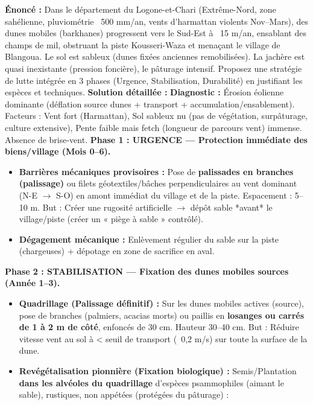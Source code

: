 \documentclass[11pt]{article}
\begin{document}
\begin{exoresolu}
    \textbf{Énoncé :} Dans le département du Logone-et-Chari (Extrême-Nord, zone sahélienne, pluviométrie ~500 mm/an, vents d'harmattan violents Nov–Mars), des dunes mobiles (barkhanes) progressent vers le Sud-Est à ~15 m/an, ensablant des champs de mil, obstruant la piste Kousseri-Waza et menaçant le village de Blangoua. Le sol est sableux (dunes fixées anciennes remobilisées). La jachère est quasi inexistante (pression foncière), le pâturage intensif. Proposez une stratégie de lutte intégrée en 3 phases (Urgence, Stabilisation, Durabilité) en justifiant les espèces et techniques.
    \tcblower
    \textbf{Solution détaillée :}
    \textbf{Diagnostic :} Érosion éolienne dominante (déflation source dunes + transport + accumulation/ensablement). Facteurs : Vent fort (Harmattan), Sol sableux nu (pas de végétation, surpâturage, culture extensive), Pente faible mais fetch (longueur de parcours vent) immense. Absence de brise-vent.
    \vspace{0,2cm}
    \textbf{Phase 1 : URGENCE — Protection immédiate des biens/village (Mois 0–6).}
    \begin{itemize}
        \item \textbf{Barrières mécaniques provisoires :} Pose de \textbf{palissades en branches (palissage)} ou filets géotextiles/bâches perpendiculaires au vent dominant (N-E $\rightarrow$ S-O) en amont immédiat du village et de la piste. Espacement : 5–10 m. But : Créer une rugosité artificielle $\rightarrow$ dépôt sable *avant* le village/piste (créer un « piège à sable » contrôlé).
        \item \textbf{Dégagement mécanique :} Enlèvement régulier du sable sur la piste (chargeuses) + dépotage en zone de sacrifice en aval.
    \end{itemize}
    \textbf{Phase 2 : STABILISATION — Fixation des dunes mobiles sources (Année 1–3).}
    \begin{itemize}
        \item \textbf{Quadrillage (Palissage définitif) :} Sur les dunes mobiles actives (source), pose de branches (palmiers, acacias morts) ou paillis en \textbf{losanges ou carrés de 1 à 2 m de côté}, enfoncés de 30 cm. Hauteur 30–40 cm. But : Réduire vitesse vent au sol à < seuil de transport (~0,2 m/s) sur toute la surface de la dune.
        \item \textbf{Revégétalisation pionnière (Fixation biologique) :} Semis/Plantation \textbf{dans les alvéoles du quadrillage} d'espèces psammophiles (aimant le sable), rustiques, non appétées (protégées du pâturage) :

\end{itemize}
\end{exoresolu}
\end{document}

